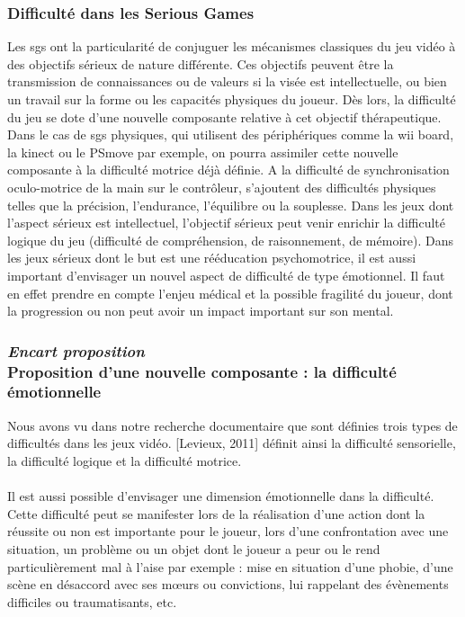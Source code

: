 	\subsubsection{Difficulté dans les Serious Games}
Les \glspl{sg} ont la particularité de conjuguer les mécanismes classiques du jeu vidéo à des objectifs sérieux de nature différente. Ces objectifs peuvent être la transmission de connaissances ou de valeurs si la visée est intellectuelle, ou bien un travail sur la forme ou les capacités physiques du joueur. Dès lors, la difficulté du jeu se dote d’une nouvelle composante relative à cet objectif thérapeutique.\\
Dans le cas de \glspl{sg} physiques, qui utilisent des périphériques comme la wii board, la kinect ou le PSmove par exemple, on pourra assimiler cette nouvelle composante à la difficulté motrice déjà définie. A la difficulté de synchronisation oculo-motrice de la main sur le contrôleur, s’ajoutent des difficultés physiques telles que la précision, l’endurance, l’équilibre ou la souplesse.
Dans les jeux dont l’aspect sérieux est intellectuel, l’objectif sérieux peut venir enrichir la difficulté logique du jeu (difficulté de compréhension, de raisonnement, de mémoire).
Dans les jeux sérieux dont le but est une rééducation psychomotrice, il est aussi important d’envisager un nouvel aspect de difficulté de type émotionnel. Il faut en effet prendre en compte l’enjeu médical et la possible fragilité du joueur, dont la progression ou non peut avoir un impact important sur son mental.
\newpage
		
\subsubsection{\emph{Encart proposition \\} Proposition d'une nouvelle composante : la difficulté émotionnelle}
Nous avons vu dans notre recherche documentaire que sont définies trois types de difficultés dans les jeux vidéo. [Levieux, 2011]\cite{Levi11} définit ainsi la difficulté sensorielle, la difficulté logique et la difficulté motrice.

\paragraph{}Il est aussi possible d’envisager une dimension émotionnelle dans la difficulté. Cette difficulté peut se manifester lors de la réalisation d’une action dont la réussite ou non est importante pour le joueur, lors d’une confrontation avec une situation, un problème ou un objet dont le joueur a peur ou le rend particulièrement mal à l’aise par exemple : mise en situation d’une phobie, d’une scène en désaccord avec ses mœurs ou convictions, lui rappelant des évènements difficiles ou traumatisants, etc.
